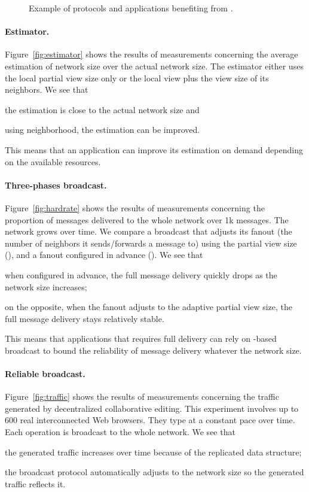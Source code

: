 \begin{figure}
\begin{center}
    \caption{Example of protocols and applications benefiting from \SPRAY.}
  \end{center}
\end{figure}

\paragraph{Estimator.} Figure~\ref{fig:estimator} shows the results of
measurements concerning the average estimation of network size over the actual
network size. The estimator either uses the local partial view size only or the
local view plus the view size of its neighbors. We see that
\begin{inparaenum}[(i)]
\item the estimation is close to the actual network size and
\item using neighborhood, the estimation can be improved.
\end{inparaenum}
This means that an application can improve its estimation on demand depending on
the available resources.

\paragraph{Three-phases broadcast.} Figure~\ref{fig:hardrate} shows the results
of measurements concerning the proportion of messages delivered to the whole
network over 1k messages. The network grows over time. We compare a broadcast
that adjusts its fanout (the number of neighbors it sends/forwards a message to)
using the partial view size (\SPRAY), and a fanout configured in advance
(\CYCLON). We see that
\begin{inparaenum}
\item when configured in advance, the full message delivery quickly drops as the
  network size increases; 
\item on the opposite, when the fanout adjusts to the adaptive partial view
  size, the full message delivery stays relatively stable.
\end{inparaenum}
This means that applications that requires full delivery can rely on
\SPRAY-based broadcast to bound the reliability of message delivery whatever the
network size.


\paragraph{Reliable broadcast.} Figure~\ref{fig:traffic} shows the results of
measurements concerning the traffic generated by decentralized collaborative
editing. This experiment involves up to 600 real interconnected Web
browsers. They type at a constant pace over time. Each operation is broadcast to
the whole network. We see that
\begin{inparaenum}
\item the generated traffic increases over time because of the replicated data
  structure;
\item the broadcast protocol automatically adjusts to the network size so the
  generated traffic reflects it.
\end{inparaenum}

